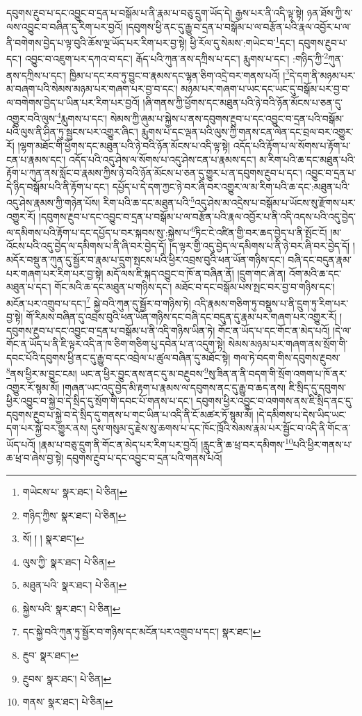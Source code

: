 དབུགས་རྔུབ་པ་དང་འབྱུང་བ་དྲན་པ་བསྒོམ་པ་ནི་རྣམ་པ་བཅུ་དྲུག་ཡོད་དེ། རྒྱས་པར་ནི་འདི་ལྟ་སྟེ། ཉན་ཐོས་ཀྱི་ས་ལས་འབྱུང་བ་བཞིན་དུ་རིག་པར་བྱའོ། །དབུགས་ཕྱི་ནང་དུ་རྒྱུ་བ་དྲན་པ་བསྒོམ་པ་ལ་བརྩོན་པའི་རྣལ་འབྱོར་པ་ལ་ནི་བགེགས་བྱེད་པ་ལྟ་བུའི་ཆོས་ལྔ་ཡོད་པར་རིག་པར་བྱ་སྟེ། ཕྱི་རོལ་དུ་སེམས་:གཡེང་བ་\footnote{གཡེངས་པ་  སྣར་ཐང་།  པེ་ཅིན། }དང་། དབུགས་རྔུབ་པ་དང་། འབྱུང་བ་འཇུག་པར་དཀའ་བ་དང་། རྒོད་པའི་ཀུན་ནས་དཀྲིས་པ་དང་། རྨུགས་པ་དང་། :གཉིད་ཀྱི་\footnote{གཉིད་ཀྱིས་  སྣར་ཐང་།  པེ་ཅིན། }ཀུན་ནས་དཀྲིས་པ་དང་། ཁྱིམ་པ་དང་རབ་ཏུ་བྱུང་བ་རྣམས་དང་ལྷན་ཅིག་འདྲེ་བར་གནས་པའོ། །\footnote{སོ། ། །  སྣར་ཐང་། }དེ་དག་ནི་མཉམ་པར་མ་བཞག་པའི་སེམས་མཉམ་པར་གཞག་པར་བྱ་བ་དང་། མཉམ་པར་གཞག་པ་ཡང་དང་ཡང་དུ་བསྒོམ་པར་བྱ་བ་ལ་བགེགས་བྱེད་པ་ཡིན་པར་རིག་པར་བྱའོ། །ཞི་གནས་ཀྱི་ཕྱོགས་དང་མཐུན་པའི་ཉེ་བའི་ཉོན་མོངས་པ་ཅན་དུ་འགྱུར་བའི་ལུས་\footnote{ལུས་ཀྱི་  སྣར་ཐང་།  པེ་ཅིན། }རྨུགས་པ་དང་། སེམས་ཀྱི་ཞུམ་པ་སྐྱེས་པ་ནས་དབུགས་རྔུབ་པ་དང་འབྱུང་བ་དྲན་པའི་བསྒོམ་པའི་ལུས་ནི་ཤིན་ཏུ་སྦྱངས་པར་འགྱུར་ཞིང་། རྨུགས་པ་དང་ལྡན་པའི་ལུས་ཀྱི་གནས་ངན་ལེན་དང་བྲལ་བར་འགྱུར་རོ། །ལྷག་མཐོང་གི་ཕྱོགས་དང་མཐུན་པའི་ཉེ་བའི་ཉོན་མོངས་པ་འདི་ལྟ་སྟེ། འདོད་པའི་རྟོག་པ་ལ་སོགས་པ་རྟོག་པ་ངན་པ་རྣམས་དང་། འདོད་པའི་འདུ་ཤེས་ལ་སོགས་པ་འདུ་ཤེས་ངན་པ་རྣམས་དང་། མ་རིག་པའི་ཆ་དང་མཐུན་པའི་རྟོག་པ་ཀུན་ནས་སློང་བ་རྣམས་ཀྱིས་ཉེ་བའི་ཉོན་མོངས་པ་ཅན་དུ་གྱུར་པ་ན་དབུགས་རྔུབ་པ་དང་། འབྱུང་བ་དྲན་པ་དེ་ཉིད་བསྒོམ་པའི་ནི་རྟོག་པ་དང་། དཔྱོད་པ་དེ་དག་ཀྱང་ཉེ་བར་ཞི་བར་འགྱུར་ལ་མ་རིག་པའི་ཆ་དང་:མཐུན་པའི་འདུ་ཤེས་རྣམས་ཀྱི་གཉེན་པོས། རིག་པའི་ཆ་དང་མཐུན་པའི་\footnote{མཐུན་པའི་  སྣར་ཐང་།  པེ་ཅིན། }འདུ་ཤེས་མ་འདྲེས་པ་བསྒོམ་པ་ཡོངས་སུ་རྫོགས་པར་འགྱུར་རོ། །དབུགས་རྔུབ་པ་དང་འབྱུང་བ་དྲན་པ་བསྒོམ་པ་ལ་བརྩོན་པའི་རྣལ་འབྱོར་པ་ནི་འདི་འདས་པའི་འདུ་བྱེད་ལ་དམིགས་པའི་རྟོག་པ་དང་དཔྱོད་པ་བར་སྐབས་སུ་:སྐྱེས་པ་\footnote{སྐྱེས་པའི་  སྣར་ཐང་།  པེ་ཅིན། }ཏིང་ངེ་འཛིན་གྱི་བར་ཆད་བྱེད་པ་ནི་སྤོང་ངོ། །མ་འོངས་པའི་འདུ་བྱེད་ལ་དམིགས་པ་ནི་ཞི་བར་བྱེད་དོ། །ད་ལྟར་གྱི་འདུ་བྱེད་ལ་དམིགས་པ་ནི་ཉེ་བར་ཞི་བར་བྱེད་དོ། །མདོར་བསྡུ་ན་ཀུན་དུ་སྦྱོར་བ་རྣམ་པ་དྲུག་སྤངས་པའི་ཕྱིར་འབྲས་བུའི་ཕན་ཡོན་གཉིས་དང་། བཞི་དང་བདུན་རྣམ་པར་གཞག་པར་རིག་པར་བྱ་སྟེ། མདོ་ལས་ཇི་སྐད་འབྱུང་བ་ཁོ་ན་བཞིན་ནོ། །དྲུག་གང་ཞེ་ན། འོག་མའི་ཆ་དང་མཐུན་པ་དང་། གོང་མའི་ཆ་དང་མཐུན་པ་གཉིས་དང་། མཐོང་བ་དང་བསྒོམ་པས་སྤང་བར་བྱ་བ་གཉིས་དང་། མངོན་པར་འགྲུབ་པ་དང་།\footnote{དང་སྐྱེ་བའི་ཀུན་ཏུ་སྦྱོར་བ་གཉིས་དང་མངོན་པར་འགྲུབ་པ་དང་།  སྣར་ཐང་། } སྐྱེ་བའི་ཀུན་དུ་སྦྱོར་བ་གཉིས་ཏེ། འདི་རྣམས་གཅིག་ཏུ་བསྡུས་པ་ནི་དྲུག་ཏུ་རིག་པར་བྱ་སྟེ། གོ་རིམས་བཞིན་དུ་འབྲས་བུའི་ཕན་ཡོན་གཉིས་དང་བཞི་དང་བདུན་དུ་རྣམ་པར་གཞག་པར་འགྱུར་རོ། །དབུགས་རྔུབ་པ་དང་འབྱུང་བ་དྲན་པ་བསྒོམ་པ་ནི་འདི་གཉིས་ཡིན་ཏེ། གོང་ན་ཡོད་པ་དང་གོང་ན་མེད་པའོ། །དེ་ལ་གོང་ན་ཡོད་པ་ནི་ཇི་ལྟར་འདི་ན་ཁ་ཅིག་གཅིག་པུ་དབེན་པ་ན་འདུག་སྟེ། སེམས་མཉམ་པར་གཞག་ནས་སྲོག་གི་དབང་པོའི་དབུགས་ཕྱི་ནང་དུ་རྒྱུ་བ་དང་འབྲེལ་པ་ཚུལ་བཞིན་དུ་མཐོང་སྟེ། གལ་ཏེ་བདག་གིས་དབུགས་རྔུབས་\footnote{རྔུབ་  སྣར་ཐང་། }ནས་ཕྱིར་མ་བྱུང་ངམ། ཡང་ན་ཕྱིར་བྱུང་ནས་ནང་དུ་མ་བརྔུབས་\footnote{རྔུབས་  སྣར་ཐང་།  པེ་ཅིན། }སུ་ཟིན་ན་ནི་བདག་གི་སྲོག་འགག་པ་ཁོ་ནར་འགྱུར་རོ་སྙམ་མོ། །གཞན་ཡང་འདུ་བྱེད་མི་རྟག་པ་རྣམས་ལ་དབུགས་ནང་དུ་རྒྱུ་བ་ཆད་ནས། ཇི་སྲིད་དུ་དབུགས་ཕྱིར་འབྱུང་བ་སྐྱེ་བ་དེ་སྲིད་དུ་སྲོག་གི་དབང་པོ་གནས་པ་དང་། དབུགས་ཕྱིར་འབྱུང་བ་འགགས་ནས་ཇི་སྲིད་ནང་དུ་དབུགས་རྔུབ་པ་སྐྱེ་བ་དེ་སྲིད་དུ་གནས་པ་གང་ཡིན་པ་འདི་ནི་ངོ་མཚར་ཏོ་སྙམ་མོ། །དེ་དམིགས་པ་དེས་ཡིད་ཡང་དག་པར་སྐྱོ་བར་གྱུར་ནས། དུས་གསུམ་དུ་རྗེས་སུ་ཆགས་པ་དང་ཁོང་ཁྲོའི་སེམས་རྣམ་པར་སྦྱོང་བ་འདི་ནི་གོང་ན་ཡོད་པའོ། །རྣམ་པ་བཅུ་དྲུག་ནི་གོང་ན་མེད་པར་རིག་པར་བྱའོ། །རླུང་ནི་ཆ་ཕྲ་བར་དམིགས་\footnote{གནས་  སྣར་ཐང་།  པེ་ཅིན། }པའི་ཕྱིར་གནས་པ་ཆ་ཕྲ་བ་ཞེས་བྱ་སྟེ། དབུགས་རྔུབ་པ་དང་འབྱུང་བ་དྲན་པའི་གནས་པའོ། 